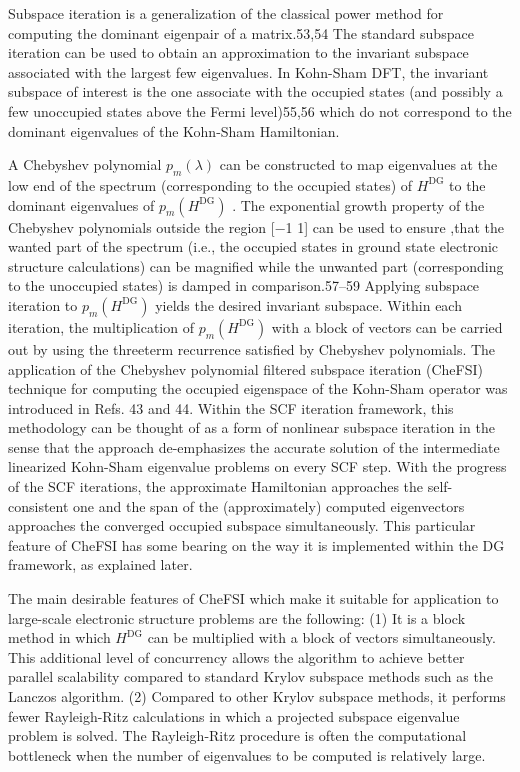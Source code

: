 \documentclass[
  10
]{article}
\begin{document}
Subspace iteration is a generalization of the classical power method for
computing the dominant eigenpair of a matrix.53,54 The standard subspace
iteration can be used to obtain an approximation to the invariant
subspace associated with the largest few eigenvalues. In Kohn-Sham DFT,
the invariant subspace of interest is the one associate with the
occupied states (and possibly a few unoccupied states above the Fermi
level)55,56 which do not correspond to the dominant eigenvalues of the
Kohn-Sham Hamiltonian.

A Chebyshev polynomial \(p _ { m } ( \lambda )\) can be constructed to
map eigenvalues at the low end of the spectrum (corresponding to the
occupied states) of \(H ^ { \mathrm { D G } }\) to the dominant
eigenvalues of \(p _ { m } ( H ^ { \mathrm { D G } } )\) . The
exponential growth property of the Chebyshev polynomials outside the
region {[}−1 1{]} can be used to ensure ,that the wanted part of the
spectrum (i.e., the occupied states in ground state electronic structure
calculations) can be magnified while the unwanted part (corresponding to
the unoccupied states) is damped in comparison.57--59 Applying subspace
iteration to \(p _ { m } ( H ^ { \mathrm { D G } } )\) yields the
desired invariant subspace. Within each iteration, the multiplication of
\(p _ { m } ( H ^ { \mathrm { D G } } )\) with a block of vectors can be
carried out by using the threeterm recurrence satisfied by Chebyshev
polynomials. The application of the Chebyshev polynomial filtered
subspace iteration (CheFSI) technique for computing the occupied
eigenspace of the Kohn-Sham operator was introduced in Refs. 43 and 44.
Within the SCF iteration framework, this methodology can be thought of
as a form of nonlinear subspace iteration in the sense that the approach
de-emphasizes the accurate solution of the intermediate linearized
Kohn-Sham eigenvalue problems on every SCF step. With the progress of
the SCF iterations, the approximate Hamiltonian approaches the
self-consistent one and the span of the (approximately) computed
eigenvectors approaches the converged occupied subspace simultaneously.
This particular feature of CheFSI has some bearing on the way it is
implemented within the DG framework, as explained later.

The main desirable features of CheFSI which make it suitable for
application to large-scale electronic structure problems are the
following: (1) It is a block method in which \(H ^ { \mathrm { D G } }\)
can be multiplied with a block of vectors simultaneously. This
additional level of concurrency allows the algorithm to achieve better
parallel scalability compared to standard Krylov subspace methods such
as the Lanczos algorithm. (2) Compared to other Krylov subspace methods,
it performs fewer Rayleigh-Ritz calculations in which a projected
subspace eigenvalue problem is solved. The Rayleigh-Ritz procedure is
often the computational bottleneck when the number of eigenvalues to be
computed is relatively large.
\end{document}

